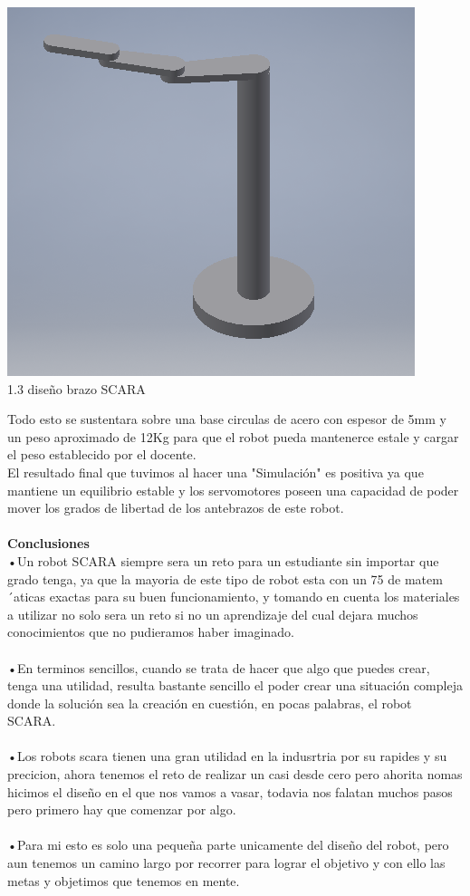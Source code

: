 \documentclass[12pt,a4paper]{article}
\begin{document}
\begin{center}
\includegraphics[scale=1]{Imagenes/AR.png}\\ 1.3 diseño brazo SCARA
\end{center}
Todo esto se sustentara sobre una base circulas de acero con espesor de 5mm y un peso aproximado de 12Kg para que el robot pueda mantenerce estale y cargar el peso establecido por el docente.\\
El resultado final que tuvimos al hacer una "Simulación" es positiva ya que mantiene un equilibrio estable y los servomotores poseen una capacidad de poder mover los grados de libertad de los antebrazos de este robot.\\
\\
\textbf{Conclusiones}\\
•Un robot SCARA siempre sera un reto para un estudiante sin importar que grado tenga, ya que la mayoria de este tipo de robot esta con un 75 de matem´aticas exactas para su buen funcionamiento, y tomando en cuenta los materiales a utilizar no solo sera un reto si no un aprendizaje del cual dejara muchos conocimientos que no pudieramos haber imaginado.\\
\\
•En terminos sencillos, cuando se trata de hacer que algo que puedes crear, tenga una utilidad, resulta bastante sencillo el poder crear una situación compleja donde la solución sea la creación en cuestión, en pocas palabras, el robot SCARA.\\
\\
•Los robots scara tienen una gran utilidad en la indusrtria por su rapides y su precicion, ahora  tenemos el reto de realizar un casi desde cero pero ahorita nomas hicimos el diseño en el que nos vamos a vasar, todavia nos falatan muchos pasos pero primero hay que comenzar por algo.\\
\\
•Para mi esto es solo una pequeña parte unicamente del diseño del robot, pero aun tenemos un camino largo por recorrer para lograr el objetivo y con ello las metas y objetimos que tenemos en mente.\\
\cite{vivas2006control}
 

\end{document}
